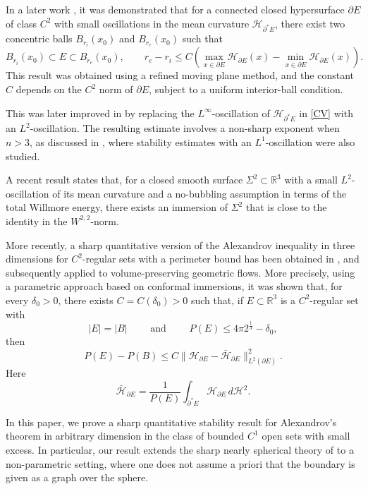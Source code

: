 \documentclass[reqno,11pt]{amsart}
\def\dz{\delta}
\numberwithin{equation}{section}
\theoremstyle{remark}
\begin{document}
In a later work \cite{CV2018}, it was demonstrated that for a connected closed hypersurface $\partial E$ of class $C^2$ with small oscillations in the mean curvature $\mathcal H_{\partial^* E}$, there exist two concentric balls $B_{r_i}(x_0)$ and $B_{r_e}(x_0)$ such that
\begin{equation}\label{CV}
B_{r_i}(x_0)\subset E\subset B_{r_e}(x_0),\qquad r_e -r_i \le C \left(\max_{x\in \partial E} \mathcal H_{\partial E}(x) -\min_{x\in \partial E} \mathcal H_{\partial E}(x)\right).
\end{equation}
This result was obtained using a refined moving plane method, and the constant $C$ depends on the $C^2$ norm of $\partial E$, subject to a uniform interior-ball condition.

This was later improved in \cite{MP2020-2} by replacing the $L^\infty$-oscillation of $\mathcal H_{\partial^* E}$ in \eqref{CV} with an $L^2$-oscillation. The resulting estimate involves a non-sharp exponent when $n>3$, as discussed in \cite{MP2019,MP2020}, where stability estimates with an $L^1$-oscillation were also studied. 

A recent result \cite{BZ2022} states that, for a closed smooth surface $\Sigma^2\subset \mathbb R^3$ with a small $L^2$-oscillation of its mean curvature and a no-bubbling assumption in terms of the total Willmore energy, there exists an immersion of $\Sigma^2$ that is close to the identity in the $W^{2,2}$-norm. 


More recently, a sharp quantitative version of the Alexandrov inequality in three dimensions for $C^2$-regular sets with a perimeter bound has been obtained in \cite{JMOS2025}, and subsequently applied to volume-preserving geometric flows. More precisely, using a parametric approach based on conformal immersions, it was shown that, for every $\delta_0>0$, there exists $C=C(\dz_0)>0$ such that, if $E\subset \mathbb R^3$ is a $C^2$-regular set with
$$|E|=|B| \qquad \text{ and } \qquad P(E)\le 4\pi 2^{\frac 1 3}-\delta_0,$$
then
$$P(E)-P(B)\le C\|\mathcal H_{\partial E}-\bar {\mathcal H}_{\partial E}\|^2_{L^2(\partial E)}.$$
Here
$$\bar {\mathcal H}_{\partial E}=\frac{1}{P(E)}\int_{\partial^* E}{\mathcal H}_{\partial E} \,d\mathcal H^2.$$





\smallskip

In this paper, we prove a sharp quantitative stability result for Alexandrov's theorem in arbitrary dimension in the class of bounded $C^1$ open sets with small excess. In particular, our result extends the sharp nearly spherical theory of \cite{KM2017, MPS2022, FZ2023} to a non-parametric setting, where one does not assume a priori that the boundary is given as a graph over the sphere. 
\end{document}
